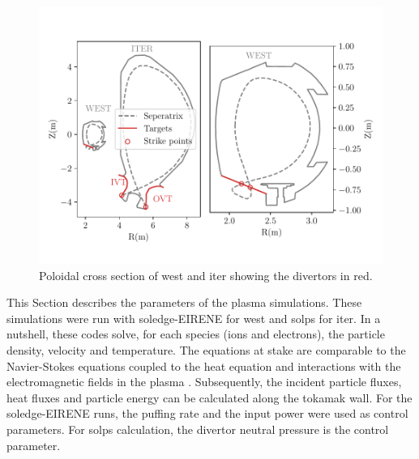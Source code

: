 \begin{figure}[h!]
    \centering
    \includegraphics[width=0.95\linewidth]{Figures/Chapter4/coordinates.pdf}
    \caption{Poloidal cross section of \gls{west} and \gls{iter} showing the \glspl{divertor} in red.}
\end{figure}
This Section describes the parameters of the plasma simulations.
These simulations were run with \gls{soledge}-EIRENE for \gls{west} and \gls{solps} for \gls{iter}.
In a nutshell, these codes solve, for each species (ions and electrons), the particle density, velocity and temperature.
The equations at stake are comparable to the Navier-Stokes equations coupled to the heat equation and interactions with the electromagnetic fields in the \gls{plasma} .
Subsequently, the incident particle fluxes, heat fluxes and particle energy can be calculated along the \gls{tokamak} wall.
For the \gls{soledge}-EIRENE runs, the puffing rate and the input power were used as control parameters.
For \gls{solps} calculation, the \gls{divertor} neutral pressure is the control parameter.

